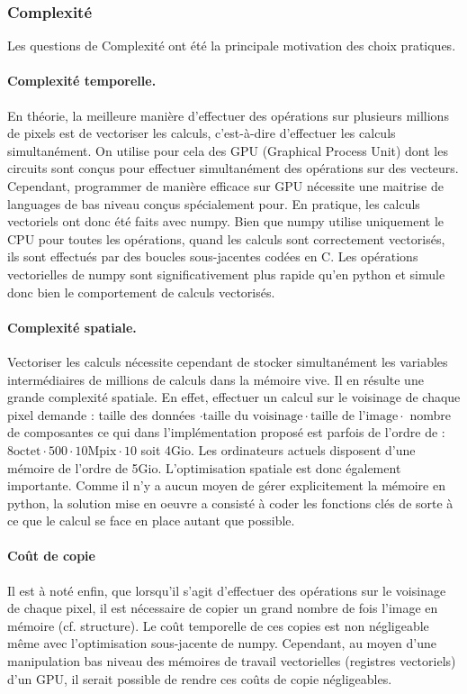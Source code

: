 \documentclass{article}
\begin{document}
\begin{multicols}{2}
\subsubsection{Complexité}

Les questions de Complexité ont été la principale motivation des choix pratiques.

\paragraph{Complexité temporelle.} En théorie, la meilleure manière d'effectuer des opérations sur plusieurs millions de pixels est de vectoriser les calculs, c'est-à-dire d'effectuer les calculs simultanément. On utilise pour cela des GPU (Graphical Process Unit) dont les circuits sont conçus pour effectuer simultanément des opérations sur des vecteurs. Cependant, programmer de manière efficace sur GPU nécessite une maitrise de languages de bas niveau conçus spécialement pour. En pratique, les calculs vectoriels ont donc été faits avec numpy. Bien que numpy utilise uniquement le CPU pour toutes les opérations, quand les calculs sont correctement vectorisés, ils sont effectués par des boucles sous-jacentes codées en C. Les opérations vectorielles de numpy sont significativement plus rapide qu'en python et simule donc bien le comportement de calculs vectorisés.

\paragraph{Complexité spatiale.} Vectoriser les calculs nécessite cependant de stocker simultanément les variables intermédiaires de millions de calculs dans la mémoire vive. Il en résulte une grande complexité spatiale. En effet, effectuer un calcul sur le voisinage de chaque pixel demande : taille des données $\cdot \text{taille du voisinage} \cdot \text{taille de l'image} \cdot$ nombre de composantes ce qui dans l'implémentation proposé est parfois de l'ordre de :  $8\text{octet} \cdot 500 \cdot 10\text{Mpix} \cdot 10$ soit 4Gio. Les ordinateurs actuels disposent d'une mémoire de l'ordre de 5Gio. L'optimisation spatiale est donc également importante. Comme il n'y a aucun moyen de gérer explicitement la mémoire en python, la solution mise en oeuvre a consisté à coder les fonctions clés de sorte à ce que le calcul se face en place autant que possible.

\paragraph{Coût de copie} Il est à noté enfin, que lorsqu'il s'agit d'effectuer des opérations sur le voisinage de chaque pixel, il est nécessaire de copier un grand nombre de fois l'image en mémoire (cf. structure). Le coût temporelle de ces copies est non négligeable même avec l'optimisation sous-jacente de numpy. Cependant, au moyen d'une manipulation bas niveau des mémoires de travail vectorielles (registres vectoriels) d'un GPU, il serait possible de rendre ces coûts de copie négligeables.


\end{multicols}
\end{document}
